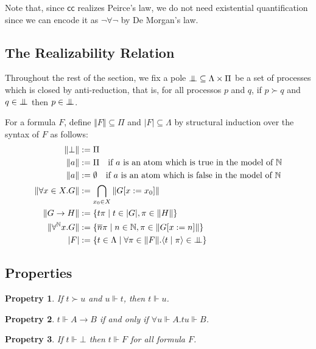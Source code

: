 \documentclass{article}
\newcommand{\N}{\mathbb{N}}
\newcommand{\proc}[2]{\langle{#1}\mid{#2}\rangle}
\newcommand{\depforall}[1]{\forall^\N #1.}
\newcommand{\pole}{\bot\mkern-10mu\bot}
\newcommand{\realizes}{\Vdash}
\newcommand{\cc}{\mathsf{cc}}
\newtheorem{property}{Propetry}
\begin{document}
Note that, since $\cc$ realizes Peirce's law, we do not need existential quantification since we can encode it as $\neg\forall\neg$ by De Morgan's law.

\subsection{The Realizability Relation}

Throughout the rest of the section, we fix a pole $\pole \subseteq \Lambda \times \Pi$ be a set of processes which is closed by anti-reduction, that is, for all processos $p$ and $q$, if $p \succ q$ and $q \in \pole$ then $p \in \pole$.

For a formula $F$, define $\Vert F \Vert \subseteq \Pi$ and $\vert F \vert \subseteq \Lambda$ by structural induction over the syntax of $F$ as follows:
\begin{align*}
    \Vert \bot \Vert & := \Pi \\
    \Vert a \Vert & := \Pi\ \ \ \text{if $a$ is an atom which is true in the model of $\N$} \\
    \Vert a \Vert & := \emptyset\ \ \ \text{if $a$ is an atom which is false in the model of $\N$} \\
    \Vert \forall x \in X. G \Vert & := \bigcap_{x_0 \in X} \Vert G[x := x_0] \Vert \\
    \Vert G \rightarrow H \Vert & := \{ t\pi \mid t \in \vert G \vert, \pi \in \Vert H \Vert \} \\
    \Vert \depforall{x} G \Vert & := \{ \overline{n}\pi \mid n \in \N, \pi \in \Vert G[x := n] \Vert \} \\
    \vert F \vert & := \{ t \in \Lambda \mid \forall \pi \in \Vert F \Vert. \proc{t}{\pi} \in \pole \}
\end{align*}

\subsection{Properties}

\begin{property}
    If $t \succ u$ and $u \realizes t$, then $t \realizes u$.
\end{property}

\begin{property}\label{impliesintro}
    $t \realizes A \rightarrow B$ if and only if $\forall u \realizes A. t u \realizes B$.
\end{property}

\begin{property}
    If $t \realizes \bot$ then $t \realizes F$ for all formula $F$.
\end{property}
\end{document}
